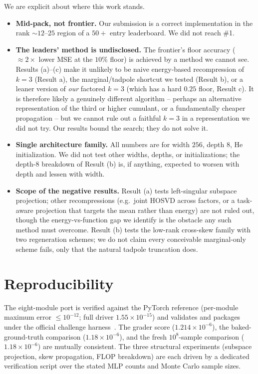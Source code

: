 \documentclass[11pt]{article}
\theoremstyle{remark}
\begin{document}
We are explicit about where this work stands.
\begin{itemize}
  \item \textbf{Mid-pack, not frontier.} Our submission is a correct
  implementation in the rank $\sim\!12$--$25$ region of a $50+$ entry
  leaderboard. We did not reach \#1.
  \item \textbf{The leaders' method is undisclosed.} The frontier's floor
  accuracy ($\approx 2\times$ lower MSE at the $10\%$ floor) is achieved by a
  method we cannot see. Results (a)--(c) make it unlikely to be naive
  energy-based recompression of $k{=}3$ (Result a), the marginal/tadpole
  shortcut we tested (Result b), or a leaner version of \emph{our} factored
  $k{=}3$ (which has a hard $0.25$ floor, Result c). It is therefore likely a
  genuinely different algorithm -- perhaps an alternative representation of the
  third or higher cumulant, or a fundamentally cheaper propagation -- but we
  cannot rule out a faithful $k{=}3$ in a representation we did not try. Our
  results bound the search; they do not solve it.
  \item \textbf{Single architecture family.} All numbers are for width $256$,
  depth $8$, He initialization. We did not test other widths, depths, or
  initializations; the depth-$8$ breakdown of Result (b) is, if anything,
  expected to worsen with depth and lessen with width.
  \item \textbf{Scope of the negative results.} Result (a) tests left-singular
  subspace projection; other recompressions (e.g.\ joint HOSVD across factors,
  or a task-aware projection that targets the mean rather than energy) are not
  ruled out, though the energy-vs-function gap we identify is the obstacle any
  such method must overcome. Result (b) tests the low-rank cross-skew family
  with two regeneration schemes; we do not claim every conceivable
  marginal-only scheme fails, only that the natural tadpole truncation does.
\end{itemize}

\section{Reproducibility}
\label{sec:repro}

The eight-module port is verified against the PyTorch reference (per-module
maximum error $\le 10^{-12}$; full driver $1.55\times10^{-15}$) and validates and
packages under the official challenge harness~\cite{arc2026whestbench,
arc_cumulant_code}. The grader score ($1.214\times10^{-6}$), the baked-ground-truth
comparison ($1.18\times10^{-6}$), and the fresh $10^8$-sample comparison
($1.18\times10^{-6}$) are mutually consistent. The three structural experiments
(subspace projection, skew propagation, FLOP breakdown) are each driven by a
dedicated verification script over the stated MLP counts and Monte Carlo
sample sizes.
\end{document}
